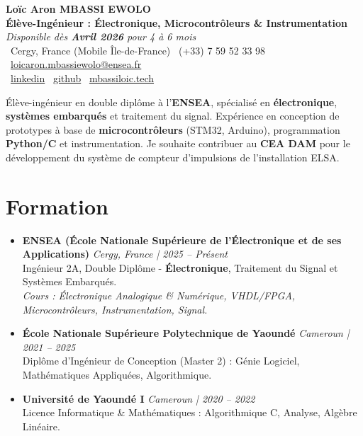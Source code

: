 \documentclass[a4paper,11pt]{article}
\begin{document}
\begin{center}
    {\Large \textbf{Loïc Aron MBASSI EWOLO}} \\ \vspace{4pt}
    \textbf{\large Élève-Ingénieur : Électronique, Microcontrôleurs \& Instrumentation} \\
    \textit{\small Disponible dès \textbf{Avril 2026} pour 4 à 6 mois} \\ \vspace{4pt}
    \small
    \faMapMarker\ Cergy, France (Mobile Île-de-France) \quad
    \faPhone\ (+33) 7 59 52 33 98 \quad
    \faEnvelope\ \href{mailto:loicaron.mbassiewolo@ensea.fr}{loicaron.mbassiewolo@ensea.fr} \\ \vspace{2pt}
    \faLinkedin\ \href{https://www.linkedin.com/in/loic-aron-mbassi-ewolo-3942a9246/}{linkedin} \quad
    \faGithub\ \href{https://github.com/Nameless0l}{github} \quad
    \faGlobe\ \href{https://mbassiloic.tech}{mbassiloic.tech}
\end{center}

\vspace{-6pt}

\noindent\small{Élève-ingénieur en double diplôme à l'\textbf{ENSEA}, spécialisé en \textbf{électronique}, \textbf{systèmes embarqués} et traitement du signal. Expérience en conception de prototypes à base de \textbf{microcontrôleurs} (STM32, Arduino), programmation \textbf{Python/C} et instrumentation. Je souhaite contribuer au \textbf{CEA DAM} pour le développement du système de compteur d'impulsions de l'installation ELSA.}

\section{Formation}
\begin{itemize}[leftmargin=*, label={.}, nosep]
    \item \textbf{ENSEA (École Nationale Supérieure de l'Électronique et de ses Applications)} \hfill \textit{Cergy, France | 2025 -- Présent} \\
    \small{Ingénieur 2A, Double Diplôme - \textbf{Électronique}, Traitement du Signal et Systèmes Embarqués.} \\
    \textit{\small{Cours : Électronique Analogique \& Numérique, VHDL/FPGA, Microcontrôleurs, Instrumentation, Signal.}}
    \vspace{2pt}
    \item \textbf{École Nationale Supérieure Polytechnique de Yaoundé} \hfill \textit{Cameroun | 2021 -- 2025} \\
    \small{Diplôme d'Ingénieur de Conception (Master 2) : Génie Logiciel, Mathématiques Appliquées, Algorithmique.}
    \item \textbf{Université de Yaoundé I} \hfill \textit{Cameroun | 2020 -- 2022} \\
    \small{Licence Informatique \& Mathématiques : Algorithmique C, Analyse, Algèbre Linéaire.}
\end{itemize}
\end{document}
